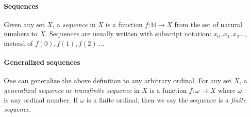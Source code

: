 \documentclass[12pt]{article}
\begin{document}
\paragraph{Sequences}

Given any set $X$, a \emph{sequence} in $X$ is a function $f\colon \mathbb{N} \to X$ from the set of natural numbers to $X$. Sequences are usually written with subscript notation: $x_0, x_1, x_2 \dots$, instead of $f(0), f(1), f(2) \dots $.

\paragraph{Generalized sequences}

One can generalize the above definition to any arbitrary ordinal. For any set $X$, a \emph{generalized sequence} or \emph{transfinite sequence} in $X$ is a function $f\colon \omega \to X$ where $\omega$ is any ordinal number. If $\omega$ is a finite ordinal, then we say the sequence is a \emph{finite sequence}.
\end{document}
